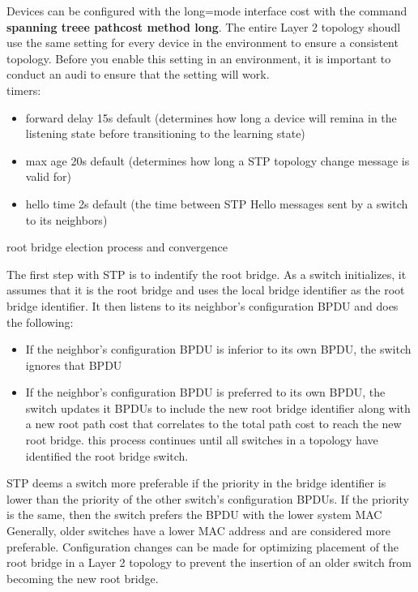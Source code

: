\documentclass[parindent=0pt]{article}
\begin{document}
Devices can be configured with the long=mode interface cost with the command \textbf{spanning treee pathcost method long}. The entire Layer 2 topology shoudl use the same setting for every device in the environment to ensure a consistent topology. Before you enable this setting in an environment, it is important to conduct an audi to ensure that the setting will work.\\

timers:
	\begin{itemize}
		\item forward delay 15s default (determines how long a device will remina in the listening state before transitioning to the learning state)
		\item max age 20s default (determines how long a STP topology change message is valid for)
		\item hello time 2s default (the time between STP Hello messages sent by a switch to its neighbors)
	\end{itemize}

root bridge election process and convergence

The first step with STP is to indentify the root bridge. As a switch initializes, it assumes that it is the root bridge and uses the local bridge identifier as the root bridge identifier. It then listens to its neighbor's configuration BPDU and does the following:
	\begin{itemize}
		\item If the neighbor's configuration BPDU is inferior to its own BPDU, the switch ignores that BPDU
		\item If the neighbor's configuration BPDU is preferred to its own BPDU, the switch updates it BPDUs to include the new root bridge identifier along with a new root path cost that correlates to the total path cost to reach the new root bridge. this process continues until all switches in a topology have identified the root bridge switch.
	\end{itemize}

STP deems a switch more preferable if the priority in the bridge identifier is lower than the priority of the other switch's configuration BPDUs. If the priority is the same, then the switch prefers the BPDU with the lower system MAC\\

Generally, older switches have a lower MAC address and are considered more preferable. Configuration changes can be made for optimizing placement of the root bridge in a Layer 2 topology to prevent the insertion of an older switch from becoming the new root bridge.\\
\end{document}
